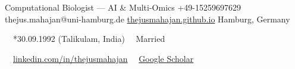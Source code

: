 \documentclass{thejus_cv}
\begin{document}
         {Computational Biologist --- AI \& Multi-Omics}
         {+49-15259697629}
         {thejus.mahajan@uni-hamburg.de}
         {\href{https://thejusmahajan.github.io}{thejusmahajan.github.io}}
         {Hamburg, Germany}

\vspace{-0.5cm}
{\small\color{white}
\faCalendar\ \ *30.09.1992 (Talikulam, India) \hspace{0.5cm} \faUser\ \ Married
}\par
\vspace{0.1cm}
{\small\color{white}
\faLinkedin\ \ \href{https://www.linkedin.com/in/thejusmahajan/}{linkedin.com/in/thejusmahajan}
\hspace{0.5cm}
\faGraduationCap\ \ \href{https://scholar.google.com/citations?user=PJkZwAwAAAAJ}{Google Scholar}
}\par
\vspace{0.1cm}
\end{document}
